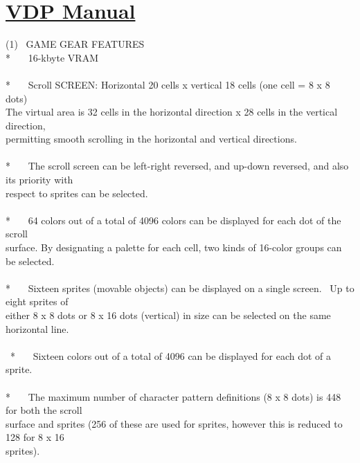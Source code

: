 \documentclass[a4paper,10pt]{article}
\begin{document}
\newpage

\section*{\uline{VDP Manual}}

\vspace{1em}

{}

\noindent (1) \ GAME GEAR FEATURES\\
{*} \ \ \ 16-kbyte VRAM\\
\\
{*} \ \ \ Scroll SCREEN: Horizontal 20 cells x vertical 18 cells (one cell = 8 x 8 dots)\\
The virtual area is 32 cells in the horizontal direction x 28 cells in the vertical direction,\\
permitting smooth scrolling in the horizontal and vertical directions.\\
\\
{*} \ \ \ The scroll screen can be left-right reversed, and up-down reversed, and also its priority with\\
respect to sprites can be selected.\\
\\
{*} \ \ \ 64 colors out of a total of 4096 colors can be displayed for each dot of the scroll\\
surface. By designating a palette for each cell, two kinds of 16-color groups can be selected.\\
\\
{*} \ \ \ Sixteen sprites (movable objects) can be displayed on a single screen. \ Up to eight sprites of\\
either 8 x 8 dots or 8 x 16 dots (vertical) in size can be selected on the same horizontal line.\\
\\
\phantom \ {*} \ \ \ Sixteen colors out of a total of 4096 can be displayed for each dot of a sprite.\\
\\
{*} \ \ \ The maximum number of character pattern definitions (8 x 8 dots) is 448 for both the scroll\\
surface and sprites (256 of these are used for sprites, however this is reduced to 128 for 8 x 16\\
sprites).


\newpage
\end{document}
